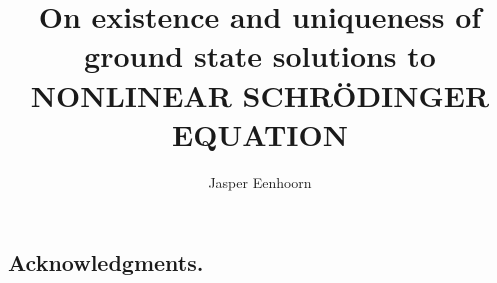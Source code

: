 \documentclass[11pt,a4paper]{amsart}
\title[]{On existence and uniqueness of ground state solutions to NONLINEAR SCHR\"ODINGER EQUATION}
\author[]{Jasper Eenhoorn}
\date{}
\theoremstyle{definition}
\numberwithin{equation}{section}
\newcommand{\comm}[1]{}
\begin{document}

















\subsection*{Acknowledgments.}
\comm{The authors are grateful to Gregory Berkolaiko, Pavel Exner and Delio Mugnolo for useful discussions.
D.F. and D.N.  acknowledge the support of FIRB 2012 project ``Dispersive dynamics: Fourier Analysis and Variational Methods'', Ministry of University and
Research of Italian Republic  (code RBFR12MXPO).
C.C. acknowledges the support of the FIR 2013 project ``Condensed Matter in Mathematical Physics'', Ministry of University and
Research of Italian Republic  (code RBFR13WAET)}
\end{document}
